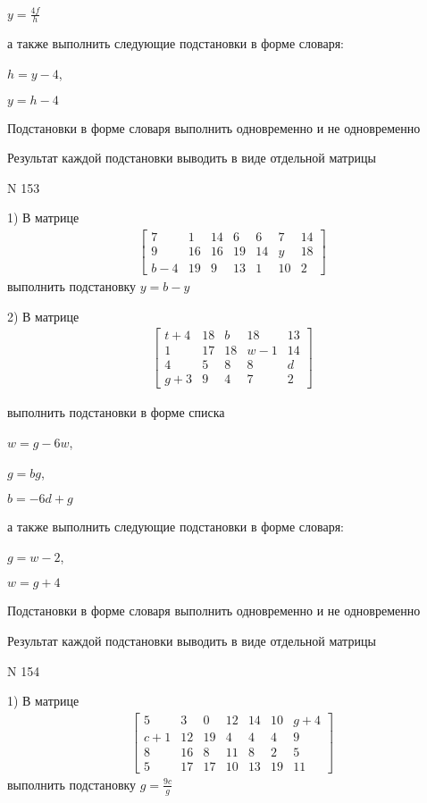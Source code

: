 \documentclass[11pt]{report}
\begin{document}
$y=\frac{4 f}{h}$

а также выполнить следующие подстановки в форме словаря:

$h=y - 4$,

$y=h - 4$


    Подстановки в форме словаря выполнить одновременно и не одновременно


    Результат каждой подстановки выводить в виде отдельной матрицы

\newpage
N 153


    1) В матрице
\begin{align*}
\left[\begin{matrix}7 & 1 & 14 & 6 & 6 & 7 & 14\\9 & 16 & 16 & 19 & 14 & y & 18\\b - 4 & 19 & 9 & 13 & 1 & 10 & 2\end{matrix}\right]
\end{align*}
выполнить подстановку $y=b - y$


    2) В матрице
\begin{align*}
\left[\begin{matrix}t + 4 & 18 & b & 18 & 13\\1 & 17 & 18 & w - 1 & 14\\4 & 5 & 8 & 8 & d\\g + 3 & 9 & 4 & 7 & 2\end{matrix}\right]
\end{align*}

выполнить подстановки в форме списка

$w=g - 6 w$,

$g=b g$,

$b=- 6 d + g$

а также выполнить следующие подстановки в форме словаря:

$g=w - 2$,

$w=g + 4$


    Подстановки в форме словаря выполнить одновременно и не одновременно


    Результат каждой подстановки выводить в виде отдельной матрицы

\newpage
N 154


    1) В матрице
\begin{align*}
\left[\begin{matrix}5 & 3 & 0 & 12 & 14 & 10 & g + 4\\c + 1 & 12 & 19 & 4 & 4 & 4 & 9\\8 & 16 & 8 & 11 & 8 & 2 & 5\\5 & 17 & 17 & 10 & 13 & 19 & 11\end{matrix}\right]
\end{align*}
выполнить подстановку $g=\frac{9 c}{g}$
\end{document}
